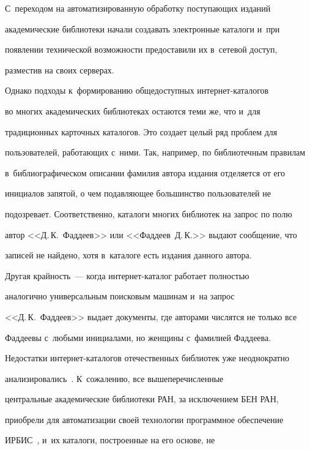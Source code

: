 С~переходом на автоматизированную обработку поступающих изданий 


академические библиотеки начали создавать электронные каталоги и~при 


появлении технической возможности предоставили их в~сетевой доступ, 


разместив на своих серверах.


  


  Однако подходы к~формированию общедоступных ин\-тер\-нет-ка\-та\-ло\-гов 


  во многих академических библиотеках остаются теми же, что и~для 


традиционных карточных каталогов. Это создает целый ряд проблем для 


пользователей, работающих с~ними. Так, например, по библиотечным правилам 


в~библиографическом описании фамилия автора издания отделяется от его 


инициалов запятой, о чем подавляющее большинство пользователей не 


подозревает. Соответственно, каталоги многих библиотек на запрос по полю 


автор <<Д.\,К.~Фаддеев>> или <<Фаддеев~Д.\,К.>> выдают сообщение, что 


записей не найдено, хотя в~каталоге есть издания данного автора. 


  


  Другая крайность~--- когда интернет-каталог работает полностью 


аналогично универсальным поисковым машинам и~на запрос 


<<Д.\,К.~Фаддеев>> выдает документы, где авторами числятся не только все 


Фаддеевы с~любыми инициалами, но женщины с~фамилией Фаддеева.


  


  Недостатки интернет-каталогов отечественных библиотек уже неоднократно 


анализировались~\cite{17-vla, 18-vla}. К~сожалению, все вышеперечисленные 


центральные академические библиотеки РАН, за исключением БЕН РАН, 


приобрели для автоматизации своей технологии программное обеспечение 


ИРБИС~\cite{19-vla}, и~их каталоги, построенные на его основе, не 


